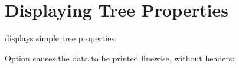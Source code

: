 \section[sct_stats]{Displaying Tree Properties}

\stats{} displays simple tree properties:


Option  causes the data to be printed linewise, without headers:


